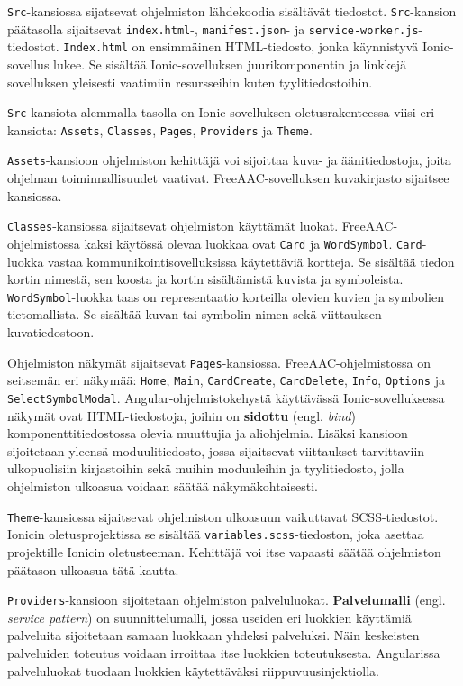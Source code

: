 \documentclass[utf8]{gradu3}
\begin{document}
\texttt{Src}-kansiossa sijatsevat ohjelmiston lähdekoodia sisältävät tiedostot. \texttt{Src}-kansion päätasolla sijaitsevat \texttt{index.html}-, \texttt{manifest.json}- ja \texttt{service-worker.js}-tiedostot. \texttt{Index.html} on ensimmäinen HTML-tiedosto, jonka käynnistyvä Ionic-sovellus lukee. Se sisältää Ionic-sovelluksen juurikomponentin ja linkkejä sovelluksen yleisesti vaatimiin resursseihin kuten tyylitiedostoihin.

\texttt{Src}-kansiota alemmalla tasolla on Ionic-sovelluksen oletusrakenteessa viisi eri kansiota: \texttt{Assets}, \texttt{Classes}, \texttt{Pages}, \texttt{Providers} ja \texttt{Theme}.

\texttt{Assets}-kansioon ohjelmiston kehittäjä voi sijoittaa kuva- ja äänitiedostoja, joita ohjelman toiminnallisuudet vaativat. FreeAAC-sovelluksen kuvakirjasto sijaitsee kansiossa.

\texttt{Classes}-kansiossa sijaitsevat ohjelmiston käyttämät luokat. FreeAAC-ohjelmistossa kaksi käytössä olevaa luokkaa ovat \texttt{Card} ja \texttt{WordSymbol}. \texttt{Card}-luokka vastaa kommunikointisovelluksissa käytettäviä kortteja. Se sisältää tiedon kortin nimestä, sen koosta ja kortin sisältämistä kuvista ja symboleista. \texttt{WordSymbol}-luokka taas on representaatio korteilla olevien kuvien ja symbolien tietomallista. Se sisältää kuvan tai symbolin nimen sekä viittauksen kuvatiedostoon.

Ohjelmiston näkymät sijaitsevat \texttt{Pages}-kansiossa. FreeAAC-ohjelmistossa on seitsemän eri näkymää: \texttt{Home}, \texttt{Main}, \texttt{CardCreate}, \texttt{CardDelete}, \texttt{Info}, \texttt{Options} ja \texttt{SelectSymbolModal}. Angular-ohjelmistokehystä käyttävässä Ionic-sovelluksessa näkymät ovat HTML-tiedostoja, joihin on \textbf{sidottu} (engl. \textit{bind}) komponenttitiedostossa olevia muuttujia ja aliohjelmia. Lisäksi kansioon sijoitetaan yleensä moduulitiedosto, jossa sijaitsevat viittaukset tarvittaviin ulkopuolisiin kirjastoihin sekä muihin moduuleihin ja tyylitiedosto, jolla ohjelmiston ulkoasua voidaan säätää näkymäkohtaisesti.

\texttt{Theme}-kansiossa sijaitsevat ohjelmiston ulkoasuun vaikuttavat SCSS-tiedostot. Ionicin oletusprojektissa se sisältää \texttt{variables.scss}-tiedoston, joka asettaa projektille Ionicin oletusteeman. Kehittäjä voi itse vapaasti säätää ohjelmiston päätason ulkoasua tätä kautta.

\texttt{Providers}-kansioon sijoitetaan ohjelmiston palveluluokat. \textbf{Palvelumalli} (engl. \textit{service pattern}) on suunnittelumalli, jossa useiden eri luokkien käyttämiä palveluita sijoitetaan samaan luokkaan yhdeksi palveluksi. Näin keskeisten palveluiden toteutus voidaan irroittaa itse luokkien toteutuksesta. Angularissa palveluluokat tuodaan luokkien käytettäväksi riippuvuusinjektiolla.
\end{document}
